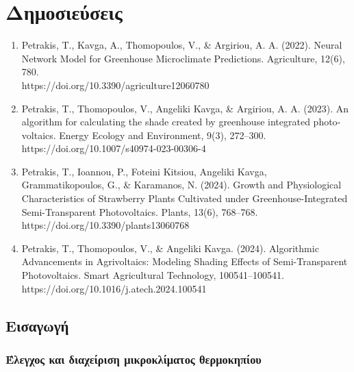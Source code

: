 \documentclass[12pt, a4paper]{report} %
\newcommand{\english}{\foreignlanguage{english}}
\newcommand{\publications}{%
  \chapter*{Δημοσιεύσεις}%
  \addcontentsline{toc}{chapter}{Δημοσιεύσεις}%
}
\begin{document}
\newpage

\publications
    \begin{enumerate}
        \sloppy
        \item \english{Petrakis, T., Kavga, A., Thomopoulos, V., \& Argiriou, A. A. (2022). Neural Network Model for Greenhouse Microclimate Predictions. Agriculture, 12(6), 780. \\
        https://doi.org/10.3390/agriculture12060780}
        \item \english{Petrakis, T., Thomopoulos, V., Angeliki Kavga, \& Argiriou, A. A. (2023). An algorithm for calculating the shade created by greenhouse integrated photovoltaics. Energy Ecology and Environment, 9(3), 272–300. \\
        https://doi.org/10.1007/s40974-023-00306-4}
        \item \english{Petrakis, T., Ioannou, P., Foteini Kitsiou, Angeliki Kavga, Grammatikopoulos, G., \& Karamanos, N. (2024). Growth and Physiological Characteristics of Strawberry Plants Cultivated under Greenhouse-Integrated Semi-Transparent Photovoltaics. Plants, 13(6), 768–768. \\
        https://doi.org/10.3390/plants13060768}
        \item \english{Petrakis, T., Thomopoulos, V., \& Angeliki Kavga. (2024). Algorithmic Advancements in Agrivoltaics: Modeling Shading Effects of Semi-Transparent Photovoltaics. Smart Agricultural Technology, 100541–100541. \\ 
        https://doi.org/10.1016/j.atech.2024.100541}
    \end{enumerate}
    


\newpage

\tableofcontents

\clearpage
\thispagestyle{empty}
\listoffigures
{}%
\clearpage
\listoftables
{}%
\newpage
{}

\newpage
\vspace*{6.5cm}
\sloppy
\section{Εισαγωγή}\label{sec_eisagwgi}
\fussy
\subsection{Έλεγχος και διαχείριση μικροκλίματος θερμοκηπίου}\label{sub_NN}
\end{document}
